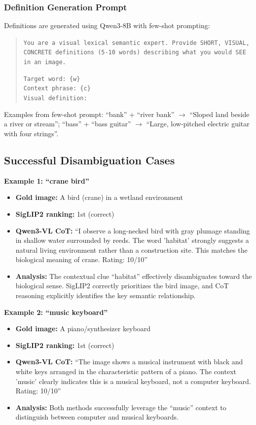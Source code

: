 \documentclass[11pt]{article}
\begin{document}
\subsubsection{Definition Generation Prompt}

Definitions are generated using Qwen3-8B with few-shot prompting:
\begin{quote}
\small
\texttt{You are a visual lexical semantic expert. Provide SHORT, VISUAL, CONCRETE definitions (5-10 words) describing what you would SEE in an image.}

\texttt{Target word: \{w\}}\\
\texttt{Context phrase: \{c\}}\\
\texttt{Visual definition:}
\end{quote}

Examples from few-shot prompt: ``bank'' + ``river bank'' $\rightarrow$ ``Sloped land beside a river or stream''; ``bass'' + ``bass guitar'' $\rightarrow$ ``Large, low-pitched electric guitar with four strings''.

\subsection{Successful Disambiguation Cases}

\textbf{Example 1: ``crane bird''}
\begin{itemize}
    \item \textbf{Gold image:} A bird (crane) in a wetland environment
    \item \textbf{SigLIP2 ranking:} 1st (correct)
    \item \textbf{Qwen3-VL CoT:} ``I observe a long-necked bird with gray plumage standing in shallow water surrounded by reeds. The word 'habitat' strongly suggests a natural living environment rather than a construction site. This matches the biological meaning of crane. Rating: 10/10''
    \item \textbf{Analysis:} The contextual clue ``habitat'' effectively disambiguates toward the biological sense. SigLIP2 correctly prioritizes the bird image, and CoT reasoning explicitly identifies the key semantic relationship.
\end{itemize}

\textbf{Example 2: ``music keyboard''}
\begin{itemize}
    \item \textbf{Gold image:} A piano/synthesizer keyboard
    \item \textbf{SigLIP2 ranking:} 1st (correct)
    \item \textbf{Qwen3-VL CoT:} ``The image shows a musical instrument with black and white keys arranged in the characteristic pattern of a piano. The context 'music' clearly indicates this is a musical keyboard, not a computer keyboard. Rating: 10/10''
    \item \textbf{Analysis:} Both methods successfully leverage the ``music'' context to distinguish between computer and musical keyboards.
\end{itemize}
\end{document}
